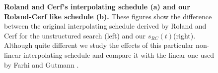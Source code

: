 
\begin{figure}[!ht]
  \centering



  \caption{\textbf{Roland and Cerf's interpolating schedule (a) and our Roland-Cerf like schedule (b).} These figures show the difference between the original interpolating schedule derived by Roland and Cerf for the unstructured search (left) and our $s_{RC}(t)$(right). Although quite different we study the effects of this particular non-linear interpolating schedule and compare it with the linear one used by Farhi and Gutmann \cite{Farhi2000}.}
  \label{fig:interpolating_schedule_compared}
\end{figure}
